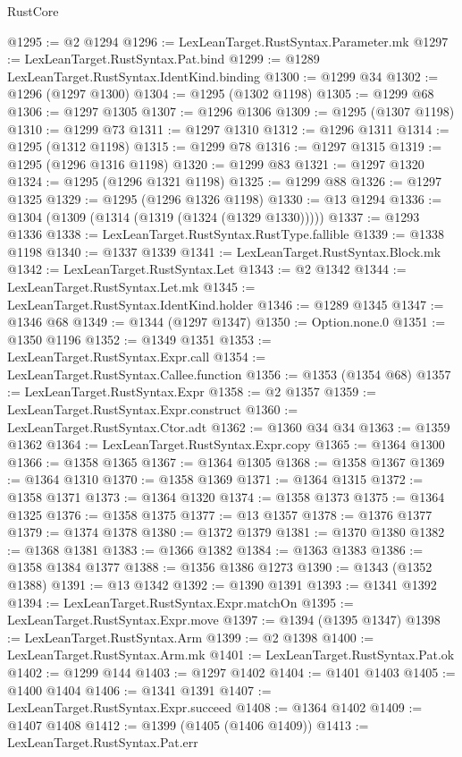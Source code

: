 \begin{lexlean}{RustCore}
\begin{coremodule}
@1295 := @2 @1294
@1296 := LexLeanTarget.RustSyntax.Parameter.mk
@1297 := LexLeanTarget.RustSyntax.Pat.bind
@1299 := @1289 LexLeanTarget.RustSyntax.IdentKind.binding
@1300 := @1299 @34
@1302 := @1296 (@1297 @1300)
@1304 := @1295 (@1302 @1198)
@1305 := @1299 @68
@1306 := @1297 @1305
@1307 := @1296 @1306
@1309 := @1295 (@1307 @1198)
@1310 := @1299 @73
@1311 := @1297 @1310
@1312 := @1296 @1311
@1314 := @1295 (@1312 @1198)
@1315 := @1299 @78
@1316 := @1297 @1315
@1319 := @1295 (@1296 @1316 @1198)
@1320 := @1299 @83
@1321 := @1297 @1320
@1324 := @1295 (@1296 @1321 @1198)
@1325 := @1299 @88
@1326 := @1297 @1325
@1329 := @1295 (@1296 @1326 @1198)
@1330 := @13 @1294
@1336 := @1304 (@1309 (@1314 (@1319 (@1324 (@1329 @1330)))))
@1337 := @1293 @1336
@1338 := LexLeanTarget.RustSyntax.RustType.fallible
@1339 := @1338 @1198
@1340 := @1337 @1339
@1341 := LexLeanTarget.RustSyntax.Block.mk
@1342 := LexLeanTarget.RustSyntax.Let
@1343 := @2 @1342
@1344 := LexLeanTarget.RustSyntax.Let.mk
@1345 := LexLeanTarget.RustSyntax.IdentKind.holder
@1346 := @1289 @1345
@1347 := @1346 @68
@1349 := @1344 (@1297 @1347)
@1350 := Option.none.{0}
@1351 := @1350 @1196
@1352 := @1349 @1351
@1353 := LexLeanTarget.RustSyntax.Expr.call
@1354 := LexLeanTarget.RustSyntax.Callee.function
@1356 := @1353 (@1354 @68)
@1357 := LexLeanTarget.RustSyntax.Expr
@1358 := @2 @1357
@1359 := LexLeanTarget.RustSyntax.Expr.construct
@1360 := LexLeanTarget.RustSyntax.Ctor.adt
@1362 := @1360 @34 @34
@1363 := @1359 @1362
@1364 := LexLeanTarget.RustSyntax.Expr.copy
@1365 := @1364 @1300
@1366 := @1358 @1365
@1367 := @1364 @1305
@1368 := @1358 @1367
@1369 := @1364 @1310
@1370 := @1358 @1369
@1371 := @1364 @1315
@1372 := @1358 @1371
@1373 := @1364 @1320
@1374 := @1358 @1373
@1375 := @1364 @1325
@1376 := @1358 @1375
@1377 := @13 @1357
@1378 := @1376 @1377
@1379 := @1374 @1378
@1380 := @1372 @1379
@1381 := @1370 @1380
@1382 := @1368 @1381
@1383 := @1366 @1382
@1384 := @1363 @1383
@1386 := @1358 @1384 @1377
@1388 := @1356 @1386 @1273
@1390 := @1343 (@1352 @1388)
@1391 := @13 @1342
@1392 := @1390 @1391
@1393 := @1341 @1392
@1394 := LexLeanTarget.RustSyntax.Expr.matchOn
@1395 := LexLeanTarget.RustSyntax.Expr.move
@1397 := @1394 (@1395 @1347)
@1398 := LexLeanTarget.RustSyntax.Arm
@1399 := @2 @1398
@1400 := LexLeanTarget.RustSyntax.Arm.mk
@1401 := LexLeanTarget.RustSyntax.Pat.ok
@1402 := @1299 @144
@1403 := @1297 @1402
@1404 := @1401 @1403
@1405 := @1400 @1404
@1406 := @1341 @1391
@1407 := LexLeanTarget.RustSyntax.Expr.succeed
@1408 := @1364 @1402
@1409 := @1407 @1408
@1412 := @1399 (@1405 (@1406 @1409))
@1413 := LexLeanTarget.RustSyntax.Pat.err

\end{coremodule}
\end{lexlean}
